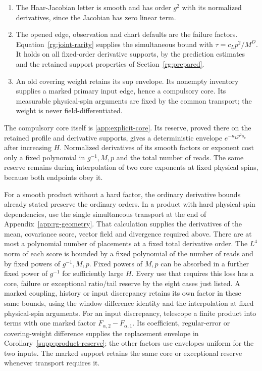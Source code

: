 \begin{enumerate}
\[\begin{aligned}
 &\le\operatorname{poly}(M,r)
     \exp\{-c_LMr/8+O_L(r\log M)+CBr\}.
 \end{aligned}
\]
This is summable over $r$ and tends to zero as $H$ increases.
Since the envelopes are less than one, their square-root sum has the
same upper bound.
Increasing $H$ makes this support-hit sum less than $(64c_*)^{-1}$.
The exponential decrease in $M$ times the number of hops dominates the
polynomial endpoint count, proving \eqref{supp:ratio-size} as well.
\item The Haar-Jacobian letter is smooth and has order $g^2$ with
its normalized derivatives, since the Jacobian has zero linear term.
\item The opened edge, observation and chart defaults are the failure
factors. Equation~\eqref{rg:joint-rarity} supplies the simultaneous bound
with $\tau=c_Lp^2/M^D$. It holds on all fixed-order derivative supports,
by the prediction estimates and the retained support properties of
Section~\ref{rg:prepared}.
\item An old covering weight retains its sup envelope. Its nonempty
inventory supplies a marked primary input edge, hence a compulsory core.
Its measurable physical-spin arguments are fixed by the common
transport; the weight is never field-differentiated.
\end{enumerate}

The compulsory core itself is \eqref{app:explicit-core}. Its reserve,
proved there on the retained profile and derivative supports, gives
a deterministic envelope $e^{-\kappa_Lp^2s_c}$ after increasing $H$.
Normalized derivatives of its smooth factors or exponent cost only a
fixed polynomial in $g^{-1},M,p$ and the total number of reads.
The same reserve remains during interpolation of two core exponents
at fixed physical spins, because both endpoints obey it.

For a smooth product without a hard factor, the ordinary derivative
bounds already stated preserve the ordinary orders. In a product with
hard physical-spin dependencies, use the single simultaneous transport
at the end of Appendix~\ref{app:rg-geometry}. That calculation supplies
the derivatives of the mean, covariance score, vector field and
divergence required above. There are at most a polynomial number of
placements at a fixed total derivative order. The $L^4$ norm of each
score is bounded by a fixed polynomial of the number of reads and by
fixed powers of $g^{-1},M,p$. Fixed powers of $M,p$ can be absorbed in a
further fixed power of $g^{-1}$ for sufficiently large $H$. Every use
that requires this loss has a core, failure or exceptional ratio/tail
reserve by the eight cases just listed. A marked coupling, history or
input discrepancy retains its own factor in these same bounds, using
the window difference identity and the interpolation at fixed
physical-spin arguments.
For an input discrepancy, telescope a finite product into terms with
one marked factor $F_{\alpha,2}-F_{\alpha,1}$. Its coefficient,
regular-error or covering-weight difference supplies the replacement
envelope in Corollary~\ref{supp:product-reserve}; the other factors
use envelopes uniform for the two inputs. The marked support retains
the same core or exceptional reserve whenever transport requires it.

